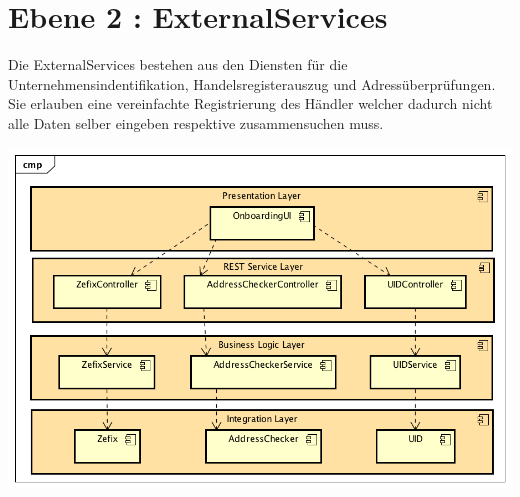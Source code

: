 \section{Ebene 2 : ExternalServices}

Die ExternalServices bestehen aus den Diensten für die Unternehmensindentifikation, Handelsregisterauszug und Adressüberprüfungen. Sie erlauben eine vereinfachte Registrierung des Händler welcher dadurch nicht alle Daten selber eingeben respektive zusammensuchen muss.

\begin{center}
	\includegraphics[scale=0.65]{ExternalServicesLevel2.png}
\end{center}

